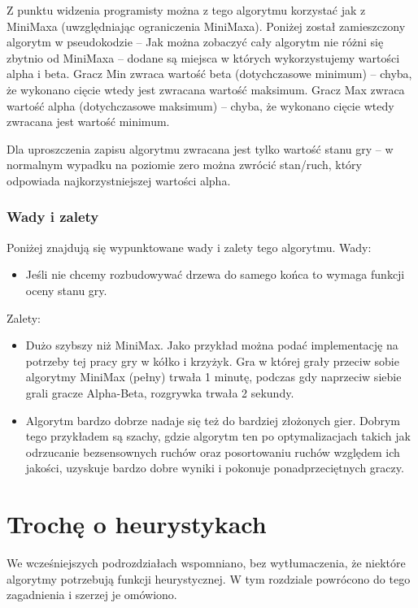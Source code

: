 \documentclass[polish,shortabstract,inz]{iithesis}
\begin{document}
Z punktu widzenia programisty można z tego algorytmu korzystać jak z MiniMaxa (uwzględniając ograniczenia MiniMaxa).
Poniżej został zamieszczony algorytm w pseudokodzie -- Jak można zobaczyć cały algorytm nie różni się zbytnio od MiniMaxa -- dodane są miejsca w których wykorzystujemy wartości alpha i beta.
Gracz Min zwraca wartość beta (dotychczasowe minimum) -- chyba, że wykonano cięcie wtedy jest zwracana wartość maksimum.
Gracz Max zwraca wartość alpha (dotychczasowe maksimum) -- chyba, że wykonano cięcie wtedy zwracana jest wartość minimum.


Dla uproszczenia zapisu algorytmu zwracana jest tylko wartość stanu gry -- w normalnym wypadku na poziomie zero można zwrócić stan/ruch, który odpowiada najkorzystniejszej wartości alpha.

\subsubsection{Wady i zalety}
Poniżej znajdują się wypunktowane wady i zalety tego algorytmu.
\newline Wady:
\begin{itemize}
  \item Jeśli nie chcemy rozbudowywać drzewa do samego końca to wymaga funkcji oceny stanu gry.
\end{itemize}
Zalety:
\begin{itemize}
  \item Dużo szybszy niż MiniMax. Jako przykład można podać implementację na potrzeby tej pracy gry w kółko i krzyżyk. Gra w której grały przeciw sobie algorytmy MiniMax (pełny) trwała 1 minutę, podczas gdy naprzeciw siebie grali gracze Alpha-Beta, rozgrywka trwała 2 sekundy.
  \item Algorytm bardzo dobrze nadaje się też do bardziej złożonych gier. Dobrym tego przykładem są szachy, gdzie algorytm ten po optymalizacjach takich jak odrzucanie bezsensownych ruchów oraz posortowaniu ruchów względem ich jakości, uzyskuje bardzo dobre wyniki i pokonuje ponadprzeciętnych graczy.
\end{itemize}

\section{Trochę o heurystykach}
We wcześniejszych podrozdziałach wspomniano, bez wytłumaczenia, że niektóre algorytmy potrzebują funkcji heurystycznej.
W tym rozdziale powrócono do tego zagadnienia i szerzej je omówiono.
\end{document}
